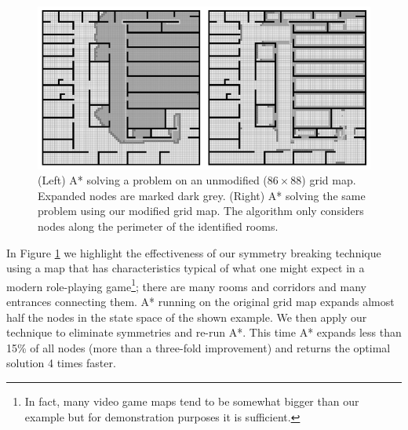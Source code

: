 \begin{figure}[t]
\centering
	    \includegraphics[width=0.95\columnwidth, trim = 10mm 10mm 10mm 0mm]{diagrams/oha_contrast.png}
		\caption{(Left) A* solving a problem on an unmodified ($86\times88$) grid map. 
		Expanded nodes are marked dark grey.
		(Right) A* solving the same problem using our modified grid map. 
		The algorithm only considers nodes along the perimeter of the identified rooms.}
	\label{fig-contrast}
\end{figure}

In Figure \ref{fig-contrast} we highlight the effectiveness of our symmetry breaking technique using
a map that has characteristics typical of what one might expect in a modern role-playing game\footnote{
In fact, many video game maps tend to be somewhat bigger than our example but for demonstration 
purposes it is sufficient.};
there are many rooms and corridors and many entrances connecting them.
A* running on the original grid map expands almost half the nodes
in the state space of the shown example.
We then apply our technique to eliminate symmetries and re-run A*.
This time A* expands less than 15\% of all nodes (more than a three-fold improvement) and returns the 
optimal solution 4 times faster.
